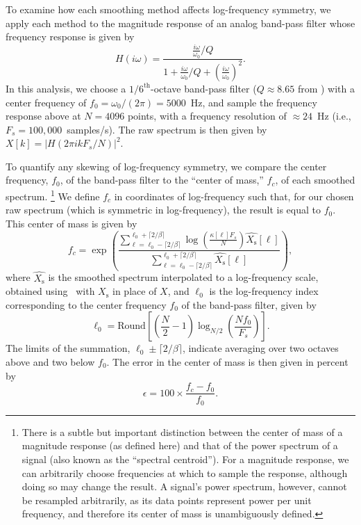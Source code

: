 To examine how each smoothing method affects log-frequency symmetry, we apply each method to the magnitude response of an analog band-pass filter whose frequency response is given by
\begin{equation}
H(i \omega) = \frac{\frac{i\omega}{\omega_0}/Q}{1 + \frac{i\omega}{\omega_0}/Q + (\frac{i\omega}{\omega_0})^2}.
\end{equation}
In this analysis, we choose a $1/6^{\textrm{th}}$-octave band-pass filter ($Q \approx 8.65$ from ) with a center frequency of $f_0 = \omega_0/(2\pi) = 5000$~Hz, and sample the frequency response above at $N = 4096$ points, with a frequency resolution of $\approx24$~Hz (i.e., $F_s = 100,000$~samples/s).
The raw spectrum is then given by $X[k] = \left| H(2 \pi i k F_s / N) \right|^2$.

To quantify any skewing of log-frequency symmetry, we compare the center frequency, $f_0$, of the band-pass filter to the ``center of mass,'' $f_c$, of each smoothed spectrum.%
\footnote{There is a subtle but important distinction between the center of mass of a magnitude response (as defined here) and that of the power spectrum of a signal (also known as the ``spectral centroid'').
For a magnitude response, we can arbitrarily choose frequencies at which to sample the response, although doing so may change the result.
A signal's power spectrum, however, cannot be resampled arbitrarily, as its data points represent power per unit frequency, and therefore its center of mass is unambiguously defined.} We define $f_c$ in coordinates of log-frequency such that, for our chosen raw spectrum (which is symmetric in log-frequency), the result is equal to $f_0$.
This center of mass is given by
\begin{equation}
f_c = \exp \left( {\frac{\displaystyle \sum_{\ell = \ell_0 - \lceil 2/\beta \rceil}^{\ell_0 + \lceil 2/\beta \rceil} \log \left( \frac{\kappa[\ell] F_s}{N} \right) \hat{X_\textrm{s}} [\ell]}{\displaystyle \sum_{\ell = \ell_0 - \lceil 2/\beta \rceil}^{\ell_0 + \lceil 2/\beta \rceil} \hat{X_\textrm{s}} [\ell]}} \right),
\end{equation}
where $\hat{X_\textrm{s}}$ is the smoothed spectrum interpolated to a log-frequency scale, obtained using~ with $X_\textrm{s}$ in place of $X$, and $\ell_0$ is the log-frequency index corresponding to the center frequency $f_0$ of the band-pass filter, given by
\begin{equation*}
\ell_0 = \textrm{Round} \left[ \left( \frac{N}{2} - 1 \right) \log_{N/2} \left( \frac{N f_0}{F_s} \right) \right].
\end{equation*}
The limits of the summation, $\ell_0 \pm \lceil 2/\beta \rceil$, indicate averaging over two octaves above and two below $f_0$.
The error in the center of mass is then given in percent by
\begin{equation}
\epsilon = 100 \times \frac{f_c - f_0}{f_0}.
\end{equation}

